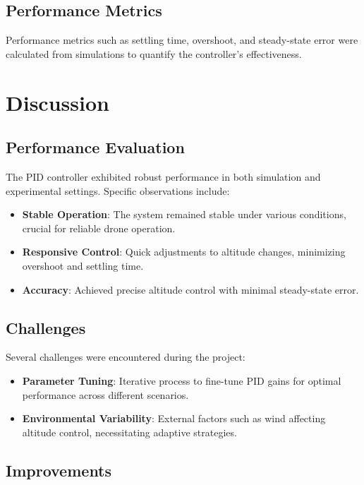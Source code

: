\documentclass[a4paper,12pt]{article}
\begin{document}
\subsection{Performance Metrics}

Performance metrics such as settling time, overshoot, and steady-state error were calculated from simulations to quantify the controller's effectiveness.

\section{Discussion}

\subsection{Performance Evaluation}

The PID controller exhibited robust performance in both simulation and experimental settings. Specific observations include:

\begin{itemize}
    \item \textbf{Stable Operation}: The system remained stable under various conditions, crucial for reliable drone operation.
    \item \textbf{Responsive Control}: Quick adjustments to altitude changes, minimizing overshoot and settling time.
    \item \textbf{Accuracy}: Achieved precise altitude control with minimal steady-state error.
\end{itemize}

\subsection{Challenges}

Several challenges were encountered during the project:

\begin{itemize}
    \item \textbf{Parameter Tuning}: Iterative process to fine-tune PID gains for optimal performance across different scenarios.
    \item \textbf{Environmental Variability}: External factors such as wind affecting altitude control, necessitating adaptive strategies.
\end{itemize}

\subsection{Improvements}
\end{document}
